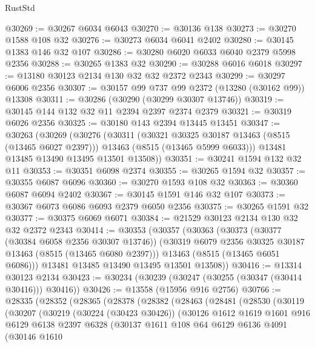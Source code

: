 \begin{lexlean}{RustStd}
\begin{coremodule}
@30269 := @30267 @6034 @6043
@30270 := @30136 @138
@30273 := @30270 @1588 @108 @32
@30276 := @30273 @6034 @6041 @2402
@30280 := @30145 @1383 @146 @32 @107
@30286 := @30280 @6020 @6033 @6040 @2379 @5998 @2356
@30288 := @30265 @1383 @32
@30290 := @30288 @6016 @6018
@30297 := @13180 @30123 @2134 @130 @32 @32 @2372 @2343
@30299 := @30297 @6006 @2356
@30307 := @30157 @99 @737 @99 @2372 (@13280 (@30162 @99)) @13308
@30311 := @30286 (@30290 (@30299 @30307 @13746))
@30319 := @30145 @144 @132 @32 @11 @2394 @2397 @2374 @2379
@30321 := @30319 @6026 @2356
@30325 := @30180 @143 @2394 @13445 @13451
@30347 := @30263
    (@30269
      (@30276
        (@30311
          (@30321 @30325 @30187 @13463 (@8515 (@13465 @6027 @2397)))
          @13463
          (@8515 (@13465 @5999 @6033)))
        @13481
        @13485
        @13490
        @13495
        @13501
        @13508))
@30351 := @30241 @1594 @132 @32 @11
@30353 := @30351 @6098 @2374
@30355 := @30265 @1594 @32
@30357 := @30355 @6087 @6096
@30360 := @30270 @1593 @108 @32
@30363 := @30360 @6087 @6094 @2402
@30367 := @30145 @1591 @146 @32 @107
@30373 := @30367 @6073 @6086 @6093 @2379 @6050 @2356
@30375 := @30265 @1591 @32
@30377 := @30375 @6069 @6071
@30384 := @21529 @30123 @2134 @130 @32 @32 @2372 @2343
@30414 := @30353
    (@30357
      (@30363
        (@30373
          (@30377 (@30384 @6058 @2356 @30307 @13746))
          (@30319 @6079 @2356 @30325 @30187 @13463 (@8515 (@13465 @6080 @2397)))
          @13463
          (@8515 (@13465 @6051 @6086)))
        @13481
        @13485
        @13490
        @13495
        @13501
        @13508))
@30416 := @13314 @30123 @2134
@30423 := @30234 (@30239 (@30247 (@30255 (@30347 (@30414 @30416))) @30416))
@30426 := @13558 (@15956 @916 @2756)
@30766 := @28335
    (@28352
      (@28365
        (@28378
          (@28382
            (@28463
              (@28481
                (@28530
                  (@30119
                    (@30207
                      (@30219
                        (@30224 (@30423 @30426))
                        (@30126
                          @1612
                          @1619
                          @1601
                          @916
                          @6129
                          @6138
                          @2397
                          @6328
                          (@30137
                            @1611
                            @108
                            @64
                            @6129
                            @6136
                            @4091
                            (@30146
                              @1610

\end{coremodule}
\end{lexlean}
